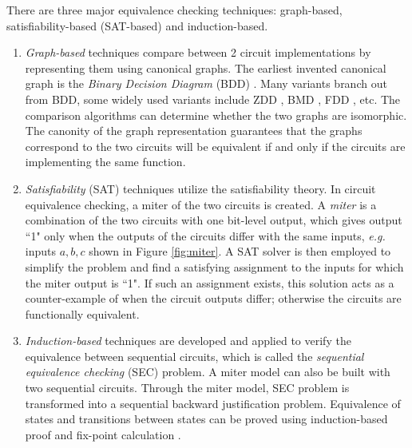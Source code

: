 There are three major
equivalence checking techniques: graph-based,
satisfiability-based (SAT-based) and induction-based.
\begin{enumerate}[{1)}]
\item \emph{Graph-based} techniques compare between 2 circuit implementations 
by representing them using canonical graphs. 
The earliest invented canonical graph is the \emph{Binary Decision Diagram} (BDD) \cite{BRYA86}.
Many variants branch out from BDD, some widely used variants include 
ZDD \cite{minato1993zero}, BMD \cite{bmd}, FDD \cite{okfdd}, etc. The comparison algorithms can 
determine whether the two graphs are isomorphic. The canonity of the graph representation guarantees that
the graphs correspond to the two circuits will be 
equivalent if and only if the circuits are implementing the same function.
\item \emph{Satisfiability} (SAT) techniques utilize the satisfiability theory.
In circuit equivalence checking, a miter of the two circuits is created.
A \emph{miter} is a combination of the two circuits with one bit-level output, which 
gives output ``1" only when the outputs of the circuits differ with 
the same inputs, {\it e.g. }inputs $a,b,c$ shown in Figure \ref{fig:miter}. 
A SAT solver \cite{csat,mishchenko2006improvements} is then employed to simplify the problem 
and find a satisfying assignment to the inputs for which the 
miter output is ``1". If such an assignment exists, this solution acts as a 
counter-example of when the circuit outputs differ; otherwise the circuits
are functionally equivalent.
\item \emph{Induction-based} techniques are developed and applied to verify the 
equivalence between sequential circuits, which is called the {\it sequential equivalence checking}
(SEC) problem. A miter model can also be built with two sequential circuits. Through the 
miter model, SEC problem is transformed into a sequential backward justification problem.
Equivalence of states and transitions between states can be proved using induction-based 
proof and fix-point calculation \cite{bjesse2000sat,stoffel1997record}.
\end{enumerate}


\begin{figure}[h]
\end{figure}

